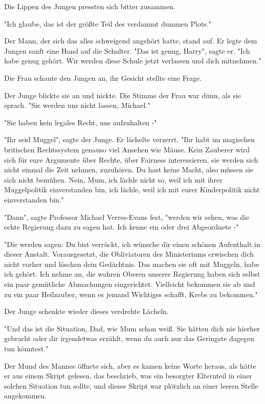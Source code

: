 {Die Lippen des Jungen pressten sich bitter zusammen.

"Ich glaube, das ist der größte Teil des verdammt dummen Plots."

Der Mann, der sich das alles schweigend angehört hatte, stand auf. Er legte dem Jungen sanft eine Hand auf die Schulter. "Das ist genug, Harry", sagte er. "Ich habe genug gehört. Wir werden diese Schule jetzt verlassen und dich mitnehmen."

Die Frau schaute den Jungen an, ihr Gesicht stellte eine Frage.

Der Junge blickte sie an und nickte. Die Stimme der Frau war dünn, als sie sprach. "Sie werden uns nicht lassen, Michael."

"Sie haben kein legales Recht, uns aufzuhalten -"

"Ihr seid Muggel", sagte der Junge. Er lächelte verzerrt. "Ihr habt im magischen britischen Rechtssystem genauso viel Ansehen wie Mäuse. Kein Zauberer wird sich für eure Argumente über Rechte, über Fairness interessieren, sie werden sich nicht einmal die Zeit nehmen, zuzuhören. Du hast keine Macht, also müssen sie sich nicht bemühen. Nein, Mum, ich lächle nicht so, weil ich mit ihrer Muggelpolitik einverstanden bin, ich lächle, weil ich mit eurer Kinderpolitik nicht einverstanden bin."

"Dann", sagte Professor Michael Verres-Evans fest, "werden wir sehen, was die echte Regierung dazu zu sagen hat. Ich kenne ein oder drei Abgeordnete -"

"Die werden sagen: Du bist verrückt, ich wünsche dir einen schönen Aufenthalt in dieser Anstalt. Vorausgesetzt, die Obliviatoren des Ministeriums erwischen dich nicht vorher und löschen dein Gedächtnis. Das machen sie oft mit Muggeln, habe ich gehört. Ich nehme an, die wahren Oberen unserer Regierung haben sich selbst ein paar gemütliche Abmachungen eingerichtet. Vielleicht bekommen sie ab und zu ein paar Heilzauber, wenn es jemand Wichtiges schafft, Krebs zu bekommen."

Der Junge schenkte wieder dieses verdrehte Lächeln.

"Und das ist die Situation, Dad, wie Mum schon weiß. Sie hätten dich nie hierher gebracht oder dir irgendetwas erzählt, wenn du auch nur das Geringste dagegen tun könntest."

Der Mund des Mannes öffnete sich, aber es kamen keine Worte heraus, als hätte er aus einem Skript gelesen, das beschrieb, was ein besorgter Elternteil in einer solchen Situation tun sollte, und dieses Skript war plötzlich an einer leeren Stelle angekommen.

}
